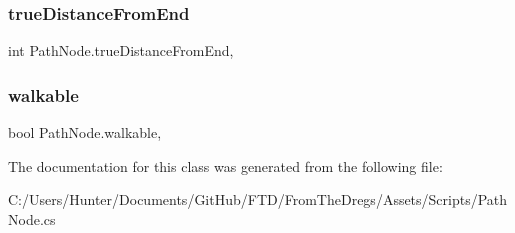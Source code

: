 \mbox{\label{class_path_node_a94623e99b6e76db825843d7fbfd57ef9}} 
\subsubsection{\texorpdfstring{trueDistanceFromEnd}{trueDistanceFromEnd}}
{\footnotesize\ttfamily int Path\+Node.\+true\+Distance\+From\+End\hspace{0.3cm}{\ttfamily [get]}, {\ttfamily [set]}}

\mbox{\label{class_path_node_a954f777fd998af56c4acc5f78cbf41ca}} 
\subsubsection{\texorpdfstring{walkable}{walkable}}
{\footnotesize\ttfamily bool Path\+Node.\+walkable\hspace{0.3cm}{\ttfamily [get]}, {\ttfamily [set]}}



The documentation for this class was generated from the following file\+:\begin{DoxyCompactItemize}
\item 
C\+:/\+Users/\+Hunter/\+Documents/\+Git\+Hub/\+F\+T\+D/\+From\+The\+Dregs/\+Assets/\+Scripts/Path\+Node.\+cs\end{DoxyCompactItemize}
